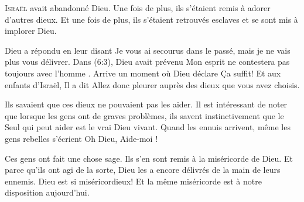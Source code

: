 \dvrule







\lettrine{I}{sraël} avait abandonné Dieu.
 Une fois de plus, ils s'étaient remis à adorer d'autres dieux.
 Et une fois de plus, ils s'étaient retrouvés esclaves
 et se sont mis à implorer Dieu.

Dieu a répondu en leur disant\frcolon{}
 \Og Je vous ai secourus dans le passé,
 mais je ne vais plus vous délivrer. \Fg{}
 Dans (6:3), Dieu avait prévenu\frcolon{}
 \Og Mon esprit ne contestera pas toujours avec l'homme \Fg{}.
 Arrive un moment où Dieu déclare\frcolon{} \Og Ça suffit! \Fg{}
 Et aux enfants d'Israël, Il a dit\frcolon{}
 \Og Allez donc pleurer auprès des dieux que vous avez choisis. \Fg{}

Ils savaient que ces dieux ne pouvaient pas les aider.
 Il est intéressant de noter que lorsque les gens ont de graves problèmes,
 ils savent instinctivement que le Seul qui peut aider est le vrai Dieu vivant.
 Quand les ennuis arrivent, même les gens rebelles s'écrient\frcolon{}
 \Og Oh Dieu, Aide-moi ! \Fg{}


Ces gens ont fait une chose sage. Ils s'en sont remis à la miséricorde de Dieu.
 Et parce qu'ils ont agi de la sorte, Dieu les a encore délivrés
 de la main de leurs ennemis. Dieu est si miséricordieux!
 Et la même miséricorde est à notre disposition aujourd'hui.


